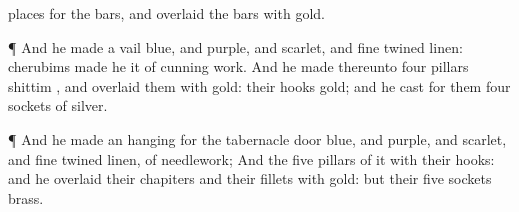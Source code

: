 {places for the
bars, and
overlaid the
bars with
gold.
\par }{\PP {}¶ And he
made a
vail
{}
blue, and
purple, and
scarlet, and fine
twined
linen:
{}
cherubims
made he it of
cunning
work.
And he
made thereunto
four
pillars
{}
shittim
{}, and
overlaid them with
gold: their
hooks
{}
gold; and he
cast for them
four
sockets of
silver.
\par }{\PP {}¶ And he
made an
hanging for the
tabernacle
door
{}
blue, and
purple, and
scarlet, and fine
twined
linen, of
needlework;
And the
five
pillars of it with their
hooks: and he
overlaid their
chapiters and their
fillets with
gold: but their
five
sockets
{}
brass.

}
